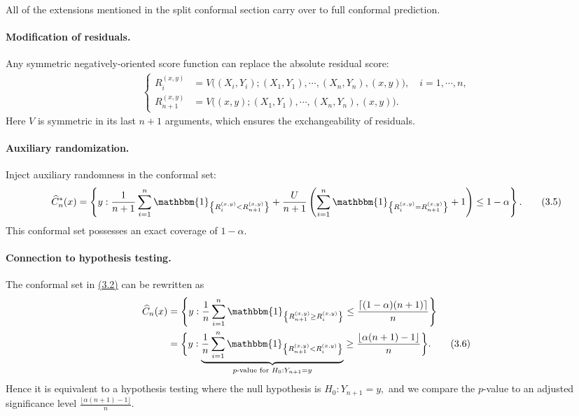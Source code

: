 \documentclass{article}
\numberwithin{equation}{section}
\begin{document}
All of the extensions mentioned in the split conformal section carry over to full conformal prediction.

\paragraph{Modification of residuals.} Any symmetric negatively-oriented score function can replace the absolute residual score:
\begin{align*}
	\begin{cases}
		R^{(x,y)}_{i} &= V\bigl((X_i,Y_i); (X_1,Y_1),\cdots,(X_n,Y_n),(x,y)\bigr),\quad i=1,\cdots,n,\\
		R^{(x,y)}_{n+1} &= V\bigl((x,y); (X_1,Y_1),\cdots,(X_n,Y_n),(x,y)\bigr).
	\end{cases}\tag{3.4}
\end{align*}
Here $V$ is symmetric in its last $n+1$ arguments, which ensures the exchangeability of residuals.

\paragraph{Auxiliary randomization.} Inject auxiliary randomness in the conformal set:
\begin{align*}
	\widehat{C}^*_n(x) = \left\{y:\frac{1}{n+1}\sum_{i=1}^n\mathbbm{1}_{\left\{R_i^{(x,y)}< R_{n+1}^{(x,y)}\right\}} + \frac{U}{n+1}\left(\sum_{i=1}^n\mathbbm{1}_{\left\{R_i^{(x,y)}= R_{n+1}^{(x,y)}\right\}} + 1\right)\leq 1-\alpha\right\}.\tag{3.5}
\end{align*}
This conformal set possesses an exact coverage of $1-\alpha$.

\paragraph{Connection to hypothesis testing.} The conformal set in \hyperref[3.2]{(3.2)} can be rewritten as
\begin{align*}
	\widehat{C}_n(x) &= \left\{y:\frac{1}{n}\sum_{i=1}^n\mathbbm{1}_{\left\{R_{n+1}^{(x,y)}\geq R_i^{(x,y)}\right\}}\leq\frac{\lceil(1-\alpha)(n+1)\rceil}{n}\right\}\\
	&= \biggl\{y:\underbrace{\frac{1}{n}\sum_{i=1}^n\mathbbm{1}_{\left\{R_{n+1}^{(x,y)} <R_i^{(x,y)}\right\}}}_{p\text{-value for } H_0:Y_{n+1}=y}\geq\frac{\lfloor\alpha(n+1)-1\rfloor}{n}\biggr\}.\tag{3.6}
\end{align*}
Hence it is equivalent to a hypothesis testing where the null hypothesis is $H_0:Y_{n+1}=y,$ and we compare the $p$-value to an adjusted significance level $\frac{\lfloor\alpha(n+1)-1\rfloor}{n}.$
\end{document}
